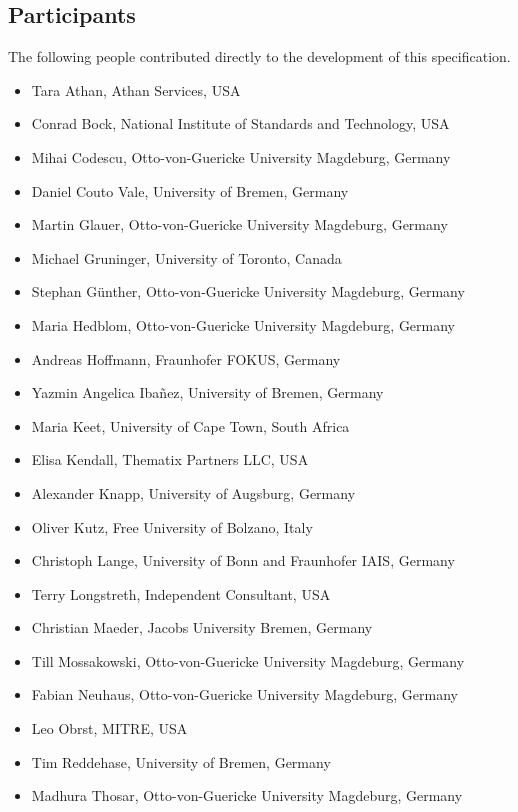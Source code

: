 \documentclass[10pt,fleqn,final]{scrreprt}
\newenvironment{definitions}[0]{\medskip }{}
\begin{document}
\begin{definitions}
\subsection{Participants}
The following people contributed directly to the development of this specification. 
	\begin{itemize}
	\item Tara Athan, Athan Services, USA 
	\item Conrad Bock, National Institute of Standards and Technology, USA
	\item Mihai Codescu, Otto-von-Guericke University Magdeburg, Germany 
        \item Daniel Couto Vale, University of Bremen, Germany
        \item Martin Glauer, Otto-von-Guericke University Magdeburg, Germany
	\item Michael Gruninger, University of Toronto, Canada  
        \item Stephan Günther, Otto-von-Guericke University Magdeburg, Germany
        \item Maria Hedblom, Otto-von-Guericke University Magdeburg, Germany
	\item Andreas Hoffmann, Fraunhofer FOKUS, Germany 
        \item Yazmin Angelica Iba\~nez, University of Bremen, Germany
	\item Maria Keet, University of Cape Town, South Africa 
	\item Elisa Kendall, Thematix Partners LLC, USA	
        \item Alexander Knapp, University of Augsburg, Germany
	\item Oliver Kutz, Free University of Bolzano, Italy
	\item Christoph Lange, University of Bonn and Fraunhofer IAIS, Germany
	\item Terry Longstreth, Independent Consultant, USA 	
        \item Christian Maeder, Jacobs University Bremen, Germany
	\item Till Mossakowski, Otto-von-Guericke University Magdeburg, Germany  	
	\item Fabian Neuhaus, Otto-von-Guericke University Magdeburg, Germany  	  
	\item Leo Obrst, MITRE, USA
        \item Tim Reddehase, University of Bremen, Germany
        \item Madhura Thosar, Otto-von-Guericke University Magdeburg, Germany
   

\end{itemize}
\end{definitions}
\end{document}
